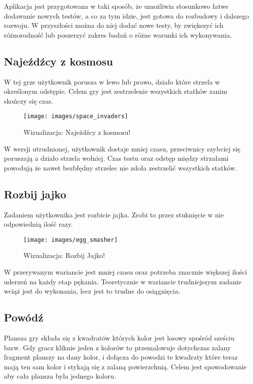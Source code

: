 \documentclass[openright]{xmgr}
\begin{document}
Aplikacja jest przygotowana w taki sposób, że umożliwia stosunkowo łatwe dodawanie nowych testów, a co za tym idzie, jest gotowa do rozbudowy i dalszego rozwoju. W przyszłości można do niej dodać nowe testy, by zwiększyć ich różnorodność lub poszerzyć zakres badań o różne warunki ich wykonywania.
\subsection{Najeźdźcy z kosmosu}
W tej grze użytkownik porusza w lewo lub prawo, działo które strzela w określonym odstępie. Celem gry jest zestrzelenie wszystkich statków zanim skończy się czas.

\begin{figure}[h]
\centering
\texttt{[image: images/space\_invaders]}
\caption{Wizualizacja: Najeźdźcy z kosmosu!}
\label{fig:space_invaders}
\end{figure}

W wersji utrudnionej, użytkownik dostaje mniej czasu, przeciwnicy szybciej się poruszają a działo strzela wolniej. Czas testu oraz odstęp między strzałami powodują że nawet bezbłędny strzelec nie zdoła zestrzelić wszystkich statków.

\subsection{Rozbij jajko}
Zadaniem użytkownika jest rozbicie jajka. Zrobi to przez stuknięcie w nie odpowiednią ilość razy.

\begin{figure}[h]
\centering
\texttt{[image: images/egg\_smasher]}
\caption{Wizualizacja: Rozbij Jajko!}
\label{fig:egg_smasher}
\end{figure}

W przerywanym wariancie jest mniej czasu oraz potrzeba znacznie większej ilości uderzeń na każdy etap pękania. Teoretycznie w wariancie trudniejszym zadanie wciąż jest do wykonania, lecz jest to trudne do osiągnięcia.

\subsection{Powódź}
Plansza gry składa się z kwadratów których kolor jest losowy spośród sześciu barw. Gdy gracz kliknie jeden z kolorów to przemalowuje dotychczas zalany fragment planszy na dany kolor, i dołącza do powodzi te kwadraty które teraz mają ten sam kolor i stykają się z zalaną powierzchnią. Celem jest spowodowanie aby cała plansza była jednego koloru.
\end{document}
